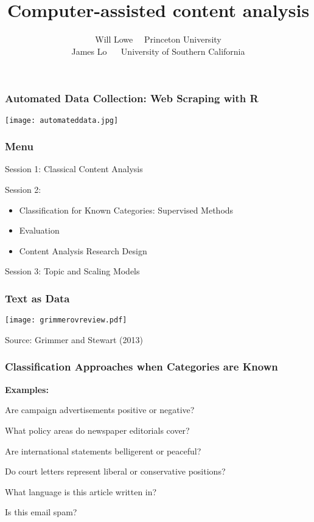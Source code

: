 \documentclass[11pt,compress,professionalfonts]{beamer}
\title{Computer-assisted content analysis}
\author{Will Lowe ~~Princeton University\\James Lo ~~ University of Southern California}
\institute{IQMR 2016 Syracuse}
\newcommand{\ita}{\begin{itemize}}
\newcommand{\itm}{\item[]}
\newcommand{\itz}{\end{itemize}}
\begin{document}
\maketitle


%
%
%
%
%


%


\begin{frame}[t,fragile]\frametitle{Automated Data Collection: Web Scraping with R}


\begin{center}\texttt{[image: automateddata.jpg]}
\end{center}




\end{frame}
\begin{frame}[t,fragile]\frametitle{Menu}

Session 1: Classical Content Analysis

Session 2:
\ita


\itm Classification for Known Categories: Supervised Methods
\itm Evaluation
\itm Content Analysis Research Design
\itz

Session 3: Topic and Scaling Models


\end{frame}
\begin{frame}[t,fragile]\frametitle{Text as Data}

\centerline{\texttt{[image: grimmerovreview.pdf]}}
\centerline{\footnotesize Source: Grimmer and Stewart (2013)}





\end{frame}
\begin{frame}[t,fragile]\frametitle{Classification Approaches when Categories are Known}

{\bf Examples:}

Are campaign advertisements positive or negative?

What  policy areas do newspaper editorials cover?

Are international statements belligerent or peaceful?

Do court letters represent liberal or conservative positions?

What language is this article written in?

Is this email spam?

\end{frame}
\end{document}
